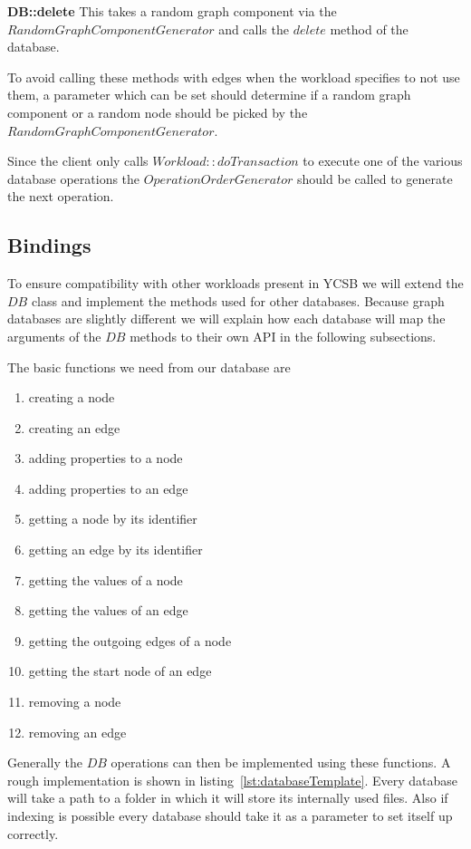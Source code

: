 \textbf{DB::delete} \newline
This takes a random graph component via the $ RandomGraphComponentGenerator $ and calls the $ delete $ method of the database.

To avoid calling these methods with edges when the workload specifies to not use them,
a parameter which can be set should determine if a random graph component or a random node should be picked by the $ RandomGraphComponentGenerator $.

Since the client only calls $ Workload::doTransaction $ to execute one of the various database operations the $ OperationOrderGenerator $ should be called to generate the next operation.

\subsection{Bindings}
\label{ch:design:se:bindings}
To ensure compatibility with other workloads present in YCSB we will extend the $ DB $ class and implement the methods used for other databases.
Because graph databases are slightly different we will explain how each database will map the arguments of the $ DB $ methods to their own API in the following subsections.

The basic functions we need from our database are

\begin{enumerate}
  \item creating a node
  \item creating an edge
  \item adding properties to a node
  \item adding properties to an edge
  \item getting a node by its identifier
  \item getting an edge by its identifier
  \item getting the values of a node
  \item getting the values of an edge
  \item getting the outgoing edges of a node
  \item getting the start node of an edge
  \item removing a node
  \item removing an edge
\end{enumerate}

Generally the $ DB $ operations can then be implemented using these functions.
A rough implementation is shown in listing~\ref{lst:databaseTemplate}.
Every database will take a path to a folder in which it will store its internally used files.
Also if indexing is possible every database should take it as a parameter to set itself up correctly.

